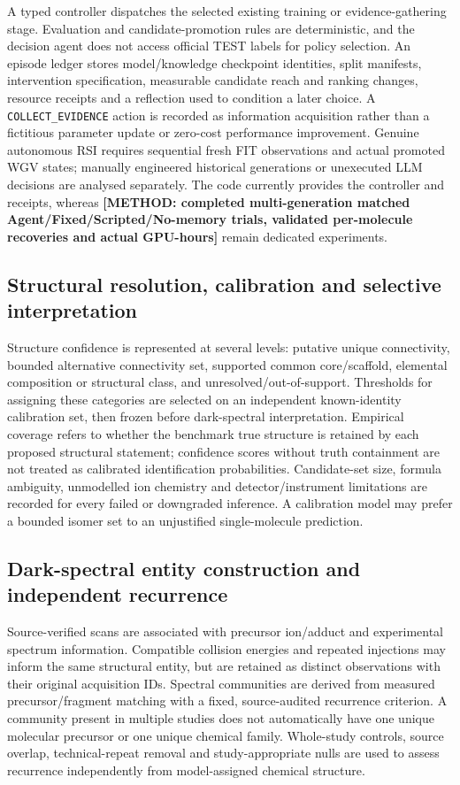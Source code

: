 \documentclass[11pt]{article}
\newcommand{\methodtodo}[1]{\textbf{\textcolor{orbitviolet}{[METHOD: #1]}}}
\begin{document}
A typed controller dispatches the selected existing training or evidence-gathering stage. Evaluation and candidate-promotion rules are deterministic, and the decision agent does not access official TEST labels for policy selection. An episode ledger stores model/knowledge checkpoint identities, split manifests, intervention specification, measurable candidate reach and ranking changes, resource receipts and a reflection used to condition a later choice. A \texttt{COLLECT\_EVIDENCE} action is recorded as information acquisition rather than a fictitious parameter update or zero-cost performance improvement. Genuine autonomous RSI requires sequential fresh FIT observations and actual promoted WGV states; manually engineered historical generations or unexecuted LLM decisions are analysed separately. The code currently provides the controller and receipts, whereas \methodtodo{completed multi-generation matched Agent/Fixed/Scripted/No-memory trials, validated per-molecule recoveries and actual GPU-hours} remain dedicated experiments.

\subsection*{Structural resolution, calibration and selective interpretation}
Structure confidence is represented at several levels: putative unique connectivity, bounded alternative connectivity set, supported common core/scaffold, elemental composition or structural class, and unresolved/out-of-support. Thresholds for assigning these categories are selected on an independent known-identity calibration set, then frozen before dark-spectral interpretation. Empirical coverage refers to whether the benchmark true structure is retained by each proposed structural statement; confidence scores without truth containment are not treated as calibrated identification probabilities. Candidate-set size, formula ambiguity, unmodelled ion chemistry and detector/instrument limitations are recorded for every failed or downgraded inference. A calibration model may prefer a bounded isomer set to an unjustified single-molecule prediction.

\subsection*{Dark-spectral entity construction and independent recurrence}
Source-verified scans are associated with precursor ion/adduct and experimental spectrum information. Compatible collision energies and repeated injections may inform the same structural entity, but are retained as distinct observations with their original acquisition IDs. Spectral communities are derived from measured precursor/fragment matching with a fixed, source-audited recurrence criterion. A community present in multiple studies does not automatically have one unique molecular precursor or one unique chemical family. Whole-study controls, source overlap, technical-repeat removal and study-appropriate nulls are used to assess recurrence independently from model-assigned chemical structure.
\end{document}
